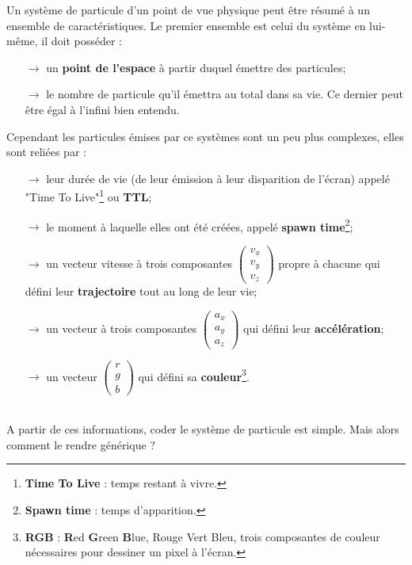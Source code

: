    Un système de particule d'un point de vue physique peut être résumé à un ensemble de caractéristiques. Le premier ensemble est celui du système en lui-même, il doit posséder :
   \begin{itemize}
    \item[$\rightarrow$] un \textbf{point de l'espace} à partir duquel émettre des particules;
    \item[$\rightarrow$] le nombre de particule qu'il émettra au total dans sa vie. Ce dernier peut \^{e}tre égal à l'infini bien entendu.
   \end{itemize}
   Cependant les particules émises par ce systèmes sont un peu plus complexes, elles sont reliées par :
   \begin{itemize}
    \item[$\rightarrow$] leur durée de vie (de leur émission à leur disparition de l'écran) appelé "Time To Live"\footnote{\textbf{Time To Live} : temps restant à vivre.} ou \textbf{TTL};
    \item[$\rightarrow$] le moment à laquelle elles ont été créées, appelé \textbf{spawn time}\footnote{\textbf{Spawn time} : temps d'apparition.};
    \item[$\rightarrow$] un vecteur vitesse à trois composantes $\begin{pmatrix}v_x \\ v_y \\ v_z \end{pmatrix}$  propre à chacune qui défini leur \textbf{trajectoire} tout au long de leur vie;
    \item[$\rightarrow$] un vecteur à trois composantes $\begin{pmatrix}a_x \\ a_y \\ a_z \end{pmatrix}$ qui défini leur \textbf{accélération};
    \item[$\rightarrow$] un vecteur $\begin{pmatrix}r\\g\\b\end{pmatrix}$ qui défini sa \textbf{couleur}\footnote{\textbf{RGB} : \textbf{R}ed \textbf{G}reen \textbf{B}lue, Rouge Vert Bleu, trois composantes de couleur nécessaires pour dessiner un pixel à l'écran.}.
   \end{itemize}
   ~\\
\indent A partir de ces informations, coder le système de particule est simple. Mais alors comment le rendre générique ?
